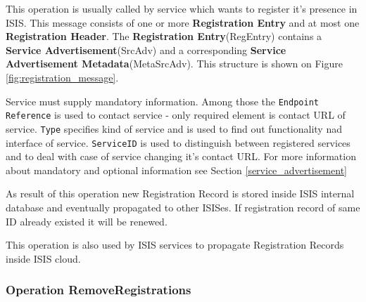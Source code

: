 \documentclass{book}
\begin{document}
This operation is usually called by service which wants to register it's presence in ISIS. This message consists of one or more \textbf{Registration Entry} and at most one \textbf{Registration Header}. The \textbf{Registration Entry}(RegEntry) contains a \textbf{Service Advertisement}(SrcAdv) and a corresponding \textbf{Service Advertisement Metadata}(MetaSrcAdv). This structure is shown on Figure \ref{fig:registration_message}.
\begin{figure}[ht]
\end{figure}

Service must supply mandatory information. Among those the \texttt{Endpoint Reference} is used to contact service - only required element is contact URL of service. \texttt{Type} specifies kind of service and is used to find out functionality nad interface of service. \texttt{ServiceID} is used to distinguish between registered services and to deal with case of service changing it's contact URL. For more information about mandatory and optional information see Section \ref{service_advertisement}

As result of this operation new Registration Record is stored inside ISIS internal database and eventually propagated to other ISISes. If registration record of same ID already existed it will be renewed.

This operation is also used by ISIS services to propagate Registration Records inside ISIS cloud.

\subsubsection{Operation RemoveRegistrations}
\end{document}
